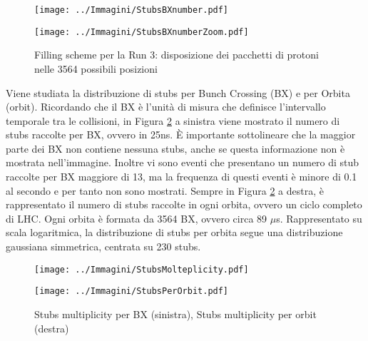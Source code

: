  \begin{figure}[t]
   \centering
   \begin{minipage}[b]{0.49\textwidth}
       \centering
       \texttt{[image: ../Immagini/StubsBXnumber.pdf]} 
     \end{minipage}
     \hfill 
     \begin{minipage}[b]{0.49\textwidth}
       \centering
       \texttt{[image: ../Immagini/StubsBXnumberZoom.pdf]} 
   \end{minipage}
   \caption{Filling scheme per la Run 3: disposizione dei pacchetti di protoni nelle 3564 possibili posizioni }
   \label{fig:Stubs1}
 \end{figure}


Viene studiata la distribuzione di stubs per Bunch Crossing (BX) e per Orbita (orbit). Ricordando che il BX è l'unità di misura che definisce l'intervallo temporale tra le collisioni, in Figura \ref{fig:StubsMolteplicity} a sinistra viene mostrato il numero di stubs raccolte per BX, ovvero in 25ns. È importante sottolineare che la maggior parte dei BX non contiene nessuna stubs, anche se questa informazione non è mostrata nell'immagine. Inoltre vi sono eventi che presentano un numero di stub raccolte per BX maggiore di 13, ma la frequenza di questi eventi è minore di 0.1 al secondo e per tanto non sono mostrati.\newline
Sempre in Figura \ref{fig:StubsMolteplicity} a destra, è rappresentato il numero di stubs raccolte in ogni orbita, ovvero un ciclo completo di LHC. Ogni orbita è formata da 3564 BX, ovvero circa 89 $\mu$s. Rappresentato su scala logaritmica, la distribuzione di stubs per orbita segue una distribuzione gaussiana simmetrica, centrata su 230 stubs. 

 \begin{figure}[t]
  \centering
  \begin{minipage}[b]{0.49\textwidth}
      \centering
      \texttt{[image: ../Immagini/StubsMolteplicity.pdf]} 
    \end{minipage}
    \hfill 
    \begin{minipage}[b]{0.49\textwidth}
      \centering
      \texttt{[image: ../Immagini/StubsPerOrbit.pdf]} 
  \end{minipage}
  \caption{Stubs multiplicity per BX (sinistra), Stubs multiplicity per orbit (destra)}
  \label{fig:StubsMolteplicity}
\end{figure}



